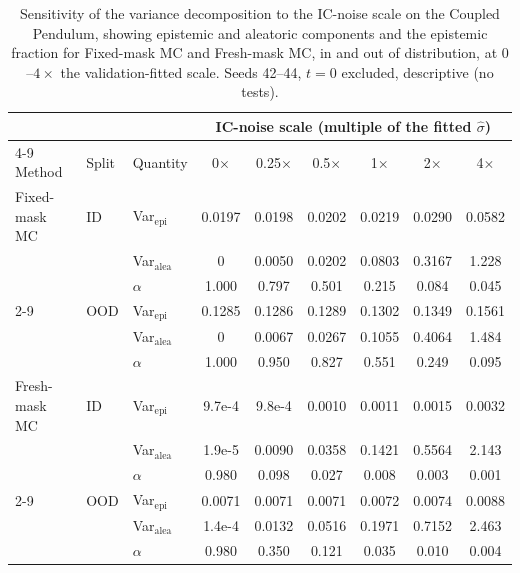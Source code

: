 \begin{table}[t]
\centering
\small
\setlength{\tabcolsep}{4pt}
\caption{Sensitivity of the variance decomposition to the IC-noise scale on the Coupled Pendulum, showing epistemic and aleatoric components and the epistemic fraction for Fixed-mask MC and Fresh-mask MC, in and out of distribution, at $0$--$4\times$ the validation-fitted scale. Seeds 42--44, $t=0$ excluded, descriptive (no tests).}
\label{tab:ic-noise-sweep}
\begin{tabular}{lllcccccc}
\toprule
 & & & \multicolumn{6}{c}{IC-noise scale (multiple of the fitted $\hat\sigma$)} \\
\cmidrule(lr){4-9}
Method & Split & Quantity & 0$\times$ & 0.25$\times$ & 0.5$\times$ & 1$\times$ & 2$\times$ & 4$\times$ \\
\midrule
Fixed-mask MC & ID & Var$_\mathrm{epi}$ & 0.0197 & 0.0198 & 0.0202 & 0.0219 & 0.0290 & 0.0582 \\
 &  & Var$_\mathrm{alea}$ & 0 & 0.0050 & 0.0202 & 0.0803 & 0.3167 & 1.228 \\
 &  & $\alpha$ & 1.000 & 0.797 & 0.501 & 0.215 & 0.084 & 0.045 \\
\cmidrule(lr){2-9}
 & OOD & Var$_\mathrm{epi}$ & 0.1285 & 0.1286 & 0.1289 & 0.1302 & 0.1349 & 0.1561 \\
 &  & Var$_\mathrm{alea}$ & 0 & 0.0067 & 0.0267 & 0.1055 & 0.4064 & 1.484 \\
 &  & $\alpha$ & 1.000 & 0.950 & 0.827 & 0.551 & 0.249 & 0.095 \\
\midrule
Fresh-mask MC & ID & Var$_\mathrm{epi}$ & 9.7e-4 & 9.8e-4 & 0.0010 & 0.0011 & 0.0015 & 0.0032 \\
 &  & Var$_\mathrm{alea}$ & 1.9e-5 & 0.0090 & 0.0358 & 0.1421 & 0.5564 & 2.143 \\
 &  & $\alpha$ & 0.980 & 0.098 & 0.027 & 0.008 & 0.003 & 0.001 \\
\cmidrule(lr){2-9}
 & OOD & Var$_\mathrm{epi}$ & 0.0071 & 0.0071 & 0.0071 & 0.0072 & 0.0074 & 0.0088 \\
 &  & Var$_\mathrm{alea}$ & 1.4e-4 & 0.0132 & 0.0516 & 0.1971 & 0.7152 & 2.463 \\
 &  & $\alpha$ & 0.980 & 0.350 & 0.121 & 0.035 & 0.010 & 0.004 \\
\bottomrule
\end{tabular}
\end{table}
